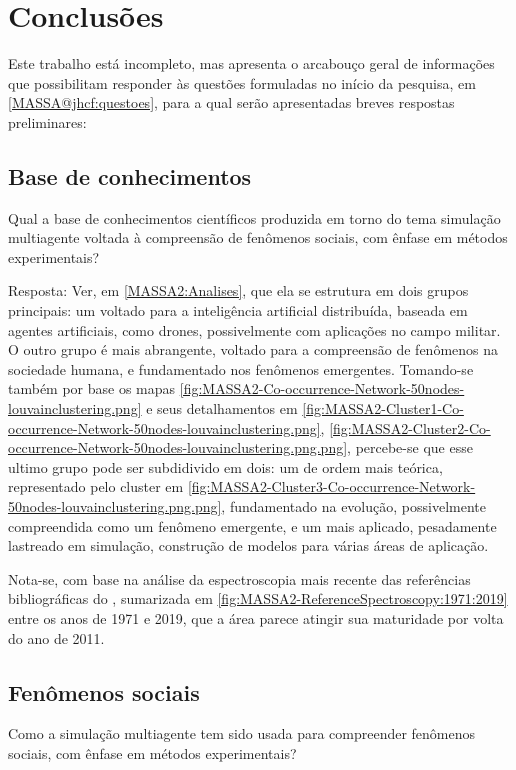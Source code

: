 \section{Conclusões}

Este trabalho está incompleto, mas apresenta o arcabouço geral de informações que possibilitam responder às  questões formuladas no início da pesquisa, em \ref{MASSA@jhcf:questoes}, para a qual serão apresentadas breves respostas preliminares:

\subsection{Base de conhecimentos}

Qual a base de conhecimentos científicos produzida em torno do tema simulação multiagente voltada à compreensão de fenômenos sociais, com ênfase em métodos experimentais?
 
Resposta: Ver, em \ref{MASSA2:Analises}, que ela se estrutura em dois grupos principais: um voltado para a inteligência artificial distribuída, baseada em agentes artificiais, como drones, possivelmente com aplicações no campo militar.
O outro grupo é mais abrangente, voltado para a compreensão de fenômenos na sociedade humana, e fundamentado
nos fenômenos emergentes.
Tomando-se também por base os mapas \ref{fig:MASSA2-Co-occurrence-Network-50nodes-louvainclustering.png} e seus detalhamentos em \ref{fig:MASSA2-Cluster1-Co-occurrence-Network-50nodes-louvainclustering.png}, \ref{fig:MASSA2-Cluster2-Co-occurrence-Network-50nodes-louvainclustering.png.png}, percebe-se que esse ultimo grupo pode ser subdidivido em dois: um de ordem mais teórica, representado pelo cluster em \ref{fig:MASSA2-Cluster3-Co-occurrence-Network-50nodes-louvainclustering.png.png}, fundamentado na evolução, possivelmente compreendida como um fenômeno emergente, e um mais aplicado, pesadamente lastreado em simulação, construção de modelos para várias áreas de aplicação.

Nota-se, com base na análise da espectroscopia mais recente das referências bibliográficas do \dataset, sumarizada em \ref{fig:MASSA2-ReferenceSpectroscopy:1971:2019} entre os anos de 1971 e 2019, que a área parece atingir sua maturidade por volta do ano de 2011.

\subsection{Fenômenos sociais}
   
Como a simulação multiagente tem sido usada para compreender fenômenos sociais, com ênfase em métodos experimentais? 

